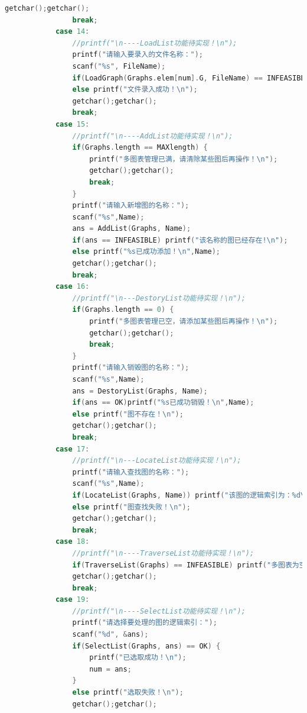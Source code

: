 \documentclass[supercite]{Experimental_Report}
\theoremstyle{definition}
\begin{document}
\begin{lstlisting}[language=c]
                getchar();getchar();
                break;
            case 14:
                //printf("\n----LoadList功能待实现！\n");
                printf("请输入要录入的文件名称：");
                scanf("%s", FileName);
                if(LoadGraph(Graphs.elem[num].G, FileName) == INFEASIBLE) printf("文件录入失败！\n");
                else printf("文件录入成功！\n");
                getchar();getchar();
                break;
            case 15:
                //printf("\n----AddList功能待实现！\n");
                if(Graphs.length == MAXlength) {
                    printf("多图表管理已满，请清除某些图后再操作！\n");
                    getchar();getchar();
                    break;
                }
                printf("请输入新增图的名称：");
                scanf("%s",Name);
                ans = AddList(Graphs, Name);
                if(ans == INFEASIBLE) printf("该名称的图已经存在!\n"); 
                else printf("%s已成功添加！\n",Name);
                getchar();getchar();
                break;
            case 16:
                //printf("\n---DestoryList功能待实现！\n");
                if(Graphs.length == 0) {
                    printf("多图表管理已空，请添加某些图后再操作！\n");
                    getchar();getchar();
                    break;
                }
                printf("请输入销毁图的名称：");
                scanf("%s",Name);
                ans = DestoryList(Graphs, Name);
                if(ans == OK)printf("%s已成功销毁！\n",Name);
                else printf("图不存在！\n");
                getchar();getchar();
                break;
            case 17:
                //printf("\n---LocateList功能待实现！\n");
                printf("请输入查找图的名称：");
                scanf("%s",Name);
                if(LocateList(Graphs, Name)) printf("该图的逻辑索引为：%d\n", LocateList(Graphs, Name));
                else printf("图查找失败！\n");
                getchar();getchar();
                break;
            case 18:
                //printf("\n----TraverseList功能待实现！\n");
                if(TraverseList(Graphs) == INFEASIBLE) printf("多图表为空！\n");
                getchar();getchar();
                break;
            case 19:
                //printf("\n----SelectList功能待实现！\n");
                printf("请选择要处理的图的逻辑索引：");
                scanf("%d", &ans);
                if(SelectList(Graphs, ans) == OK) {
                    printf("已选取成功！\n");
                    num = ans;
                }
                else printf("选取失败！\n");
                getchar();getchar();

\end{lstlisting}
\end{document}
